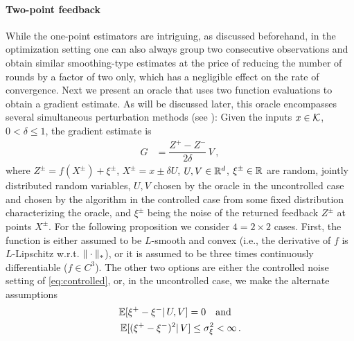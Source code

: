 \paragraph{Two-point feedback}
While the one-point estimators are intriguing, as discussed beforehand,
in the optimization setting one can also always group two consecutive observations and obtain similar smoothing-type estimates 
at the price of reducing the number of rounds by a factor of two only, which has a negligible effect on the rate of convergence.
Next we present an oracle that uses two function evaluations to obtain a gradient estimate.
As will be discussed later, this oracle encompasses several simultaneous perturbation methods (see \citealp{bhatnagar-book}):
Given the inputs $x\in \mathcal{K}$,  $0<\delta\le 1$,
the gradient estimate is
\begin{align}
G &=  \dfrac{Z^+ - Z^-}{2\delta}\, V \,, 
 \label{eq:twosp}
\end{align}
where $Z^{\pm} = f(X^{\pm}) + \xi^{\pm}$, $X^{\pm} = x \pm \delta U$, $U,V\in \mathbb{R}^d$, $\xi^{\pm}\in \mathbb{R}$ are random, jointly distributed random variables, $U,V$ chosen by the oracle in the uncontrolled case and chosen by the algorithm in the controlled case
from some fixed distribution characterizing the oracle, and $\xi^{\pm}$ being the noise of the returned feedback $Z^{\pm}$ at points $X^{\pm}$.
For the following proposition we consider $4=2\times 2$ cases.
First, the function is either assumed to be $L$-smooth and convex (i.e., the derivative of $f$ is $L$-Lipschitz w.r.t. $\|\cdot\|_*$), or it is assumed to be three times continuously differentiable ($f\in C^3$).
The other two options are either the controlled noise  setting of \eqref{eq:controlled}, or, in the uncontrolled case, we make the alternate assumptions
\begin{align}
\mathbb{E}[\xi^+-\xi^- |\, U,V] = 0 \text{~~ and ~~}\nonumber\\
\mathbb{E} [ (\xi^{+} - \xi^-)^{2} |\, V] \le \sigma_\xi^2 <\infty\,.
\label{eq:noiseass}
\end{align}

